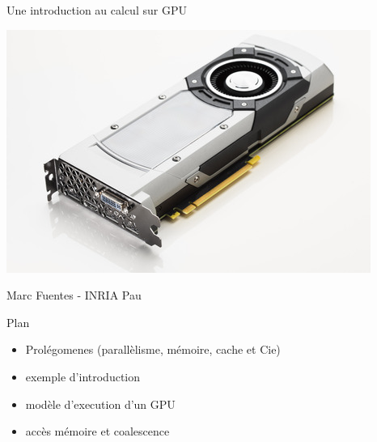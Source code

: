 \documentclass[11pt,mathserif]{beamer}
\begin{document}
\begin{frame}
\begin{center}
{\Large Une introduction au calcul sur GPU} 
\end{center}
\begin{center}
\includegraphics[width=0.5\linewidth]{fig/gpu.jpg}
\end{center}
\begin{center}
{\large Marc Fuentes - INRIA Pau\\ }
\end{center}
\end{frame}


\begin{frame}{Plan}
\begin{itemize}[<+->]
\item Prolégomenes (parallèlisme, mémoire, cache et Cie)
\item exemple d'introduction
\item modèle d'execution d'un GPU
\item accès mémoire et coalescence
\end{itemize}
\end{frame}
\end{document}
